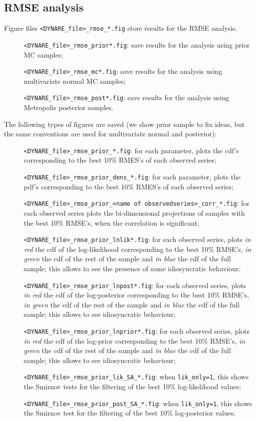 \documentclass[12pt,a4paper]{article}
\begin{document}
\subsection{RMSE analysis}
Figure files \verb"<DYNARE_file>_rmse_*.fig" store results for the
RMSE analysis.
\begin{description}
\item[]\verb"<DYNARE_file>_rmse_prior*.fig": save results for
the analysis using prior MC samples;
\item[]\verb"<DYNARE_file>_rmse_mc*.fig": save results for
the analysis using multivariate normal MC samples;
\item[]\verb"<DYNARE_file>_rmse_post*.fig": save results for
the analysis using Metropolis posterior samples.
\end{description}

The following types of figures are saved (we show prior sample to
fix ideas, but the same conventions are used for multivariate
normal and posterior):
\begin{description}
\item[]\verb"<DYNARE_file>_rmse_prior_*.fig": for each parameter, plots the cdf's
corresponding to the best 10\% RMES's of each observed series;
\item[]\verb"<DYNARE_file>_rmse_prior_dens_*.fig": for each parameter, plots the pdf's
corresponding to the best 10\% RMES's of each observed series;
\item[]\verb"<DYNARE_file>_rmse_prior_<name of observedseries>_corr_*.fig": for each observed series plots the
bi-dimensional projections of samples with the best 10\% RMSE's,
when the correlation is significant;
\item[]\verb"<DYNARE_file>_rmse_prior_lnlik*.fig": for each observed
series, plots \emph{in red} the cdf of the log-likelihood
corresponding to the best 10\% RMSE's, \emph{in green} the cdf of
the rest of the sample and \emph{in blue }the cdf of the full
sample; this allows to see the  presence of some idiosyncratic
behaviour;
\item[]\verb"<DYNARE_file>_rmse_prior_lnpost*.fig": for each observed
series, plots \emph{in red} the cdf of the log-posterior
corresponding to the best 10\% RMSE's, \emph{in green} the cdf of
the rest of the sample and \emph{in blue }the cdf of the full
sample; this allows to see idiosyncratic behaviour;
\item[]\verb"<DYNARE_file>_rmse_prior_lnprior*.fig": for each observed
series, plots \emph{in red} the cdf of the log-prior corresponding
to the best 10\% RMSE's, \emph{in green} the cdf of the rest of
the sample and \emph{in blue }the cdf of the full sample; this
allows to see idiosyncratic behaviour;
\item[]\verb"<DYNARE_file>_rmse_prior_lik_SA_*.fig": when
\verb"lik_only=1", this shows the Smirnov tests for the filtering
of the best 10\% log-likelihood values;
\item[]\verb"<DYNARE_file>_rmse_prior_post_SA_*.fig": when
\verb"lik_only=1", this shows the Smirnov test for the filtering
of the best 10\% log-posterior values.
\end{description}
\end{document}
